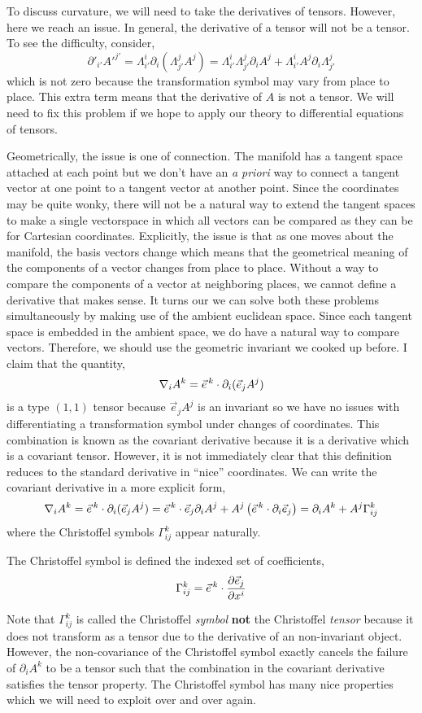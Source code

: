 \documentclass[11pt, a4paper]{article}
\begin{document}
To discuss curvature, we will need to take the derivatives of tensors. However, here we reach an issue. In general, the derivative of a tensor will not be a tensor. To see the difficulty, consider,
\[ \partial'_{i'} A'^{j'} = \Lambda_{i'}^i \partial_i (\Lambda^j_{j'} A^j) = \Lambda_{i'}^i \Lambda^j_{j'} \partial_i  A^j +  \Lambda_{i'}^i A^j \partial_i \Lambda^j_{j'} \]
which is not zero because the transformation symbol may vary from place to place. This extra term means that the derivative of $A$ is not a tensor. We will need to fix this problem if we hope to apply our theory to differential equations of tensors. 
\par
Geometrically, the issue is one of connection. The manifold has a tangent space attached at each point but we don't have an \textit{a priori} way to connect a tangent vector at one point to a tangent vector at another point. Since the coordinates may be quite wonky, there will not be a natural way to extend the tangent spaces to make a single vectorspace in which all vectors can be compared as they can be for Cartesian coordinates. Explicitly, the issue is that as one moves about the manifold, the basis vectors change which means that the geometrical meaning of the components of a vector changes from place to place. Without a way to compare the components of a vector at neighboring places, we cannot define a derivative that makes sense. It turns our we can solve both these problems simultaneously by making use of the ambient euclidean space. Since each tangent space is embedded in the ambient space, we do have a natural way to compare vectors. Therefore, we should use the geometric invariant we cooked up before. I claim that the quantity,
\[ \nabla_i A^k =  \vec{e}^{\, k} \cdot \partial_i (\vec{e}_j A^j) \]
is a type $(1, 1)$ tensor because $\vec{e}_j A^j$ is an invariant so we have no issues with differentiating a transformation symbol under changes of coordinates. This combination is known as the covariant derivative because it is a derivative which is a covariant tensor. However, it is not immediately clear that this definition reduces to the standard derivative in ``nice'' coordinates. We can write the covariant derivative in a more explicit form,
\[ \nabla_i A^k =  \vec{e}^{\, k} \cdot \partial_i (\vec{e}_j A^j) = \vec{e}^{\, k} \cdot \vec{e}_j \partial_i A^j + A^j \left( \vec{e}^{\, k} \cdot \partial_i \vec{e}_j \right) = \partial_i A^k + A^j \Gamma^k_{ij} \]
where the Christoffel symbols $\Gamma^k_{ij}$ appear naturally.

\begin{definition}
The Christoffel symbol is defined the indexed set of coefficients,
\[ \Gamma^k_{ij} = \vec{e}^{\, k} \cdot \frac{\partial{\vec{e}_j}}{\partial{x^i}} \]
\end{definition}  
Note that $\Gamma^k_{ij}$ is called the Christoffel \textit{symbol} \textbf{not} the Christoffel \textit{tensor} because it does not transform as a tensor due to the derivative of an non-invariant object. However, the non-covariance of the Christoffel symbol exactly cancels the failure of $\partial_i A^k$ to be a tensor such that the combination in the covariant derivative satisfies the tensor property. The Christoffel symbol has many nice properties which we will need to exploit over and over again.
\end{document}
